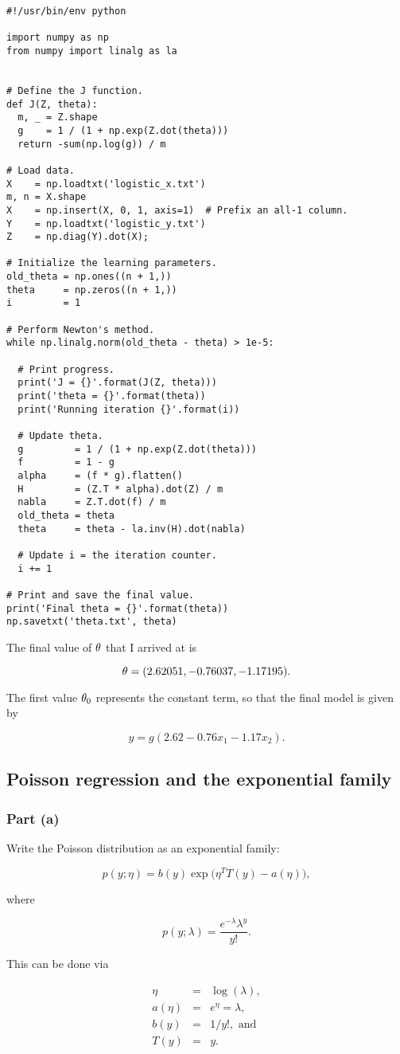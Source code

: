 \documentclass[]{article}
\begin{document}
\begin{verbatim}
#!/usr/bin/env python

import numpy as np
from numpy import linalg as la


# Define the J function.
def J(Z, theta):
  m, _ = Z.shape
  g    = 1 / (1 + np.exp(Z.dot(theta)))
  return -sum(np.log(g)) / m

# Load data.
X    = np.loadtxt('logistic_x.txt')
m, n = X.shape
X    = np.insert(X, 0, 1, axis=1)  # Prefix an all-1 column.
Y    = np.loadtxt('logistic_y.txt')
Z    = np.diag(Y).dot(X);

# Initialize the learning parameters.
old_theta = np.ones((n + 1,))
theta     = np.zeros((n + 1,))
i         = 1

# Perform Newton's method.
while np.linalg.norm(old_theta - theta) > 1e-5:

  # Print progress.
  print('J = {}'.format(J(Z, theta)))
  print('theta = {}'.format(theta))
  print('Running iteration {}'.format(i))

  # Update theta.
  g         = 1 / (1 + np.exp(Z.dot(theta)))
  f         = 1 - g
  alpha     = (f * g).flatten()
  H         = (Z.T * alpha).dot(Z) / m
  nabla     = Z.T.dot(f) / m
  old_theta = theta
  theta     = theta - la.inv(H).dot(nabla)

  # Update i = the iteration counter.
  i += 1

# Print and save the final value.
print('Final theta = {}'.format(theta))
np.savetxt('theta.txt', theta)
\end{verbatim}

The final value of \(\theta\) that I arrived at is

\[\theta = (2.62051, -0.76037, -1.17195).\]

The first value \(\theta_0\) represents the constant term, so that the
final model is given by

\[y = g(2.62 - 0.76x_1 - 1.17x_2).\]

\subsection{Poisson regression and the exponential
family}\label{poisson-regression-and-the-exponential-family}

\subsubsection{Part (a)}\label{part-a-1}

Write the Poisson distribution as an exponential family:

\[p(y;\eta) = b(y)\exp\big(\eta^T T(y) - a(\eta)\big),\]

where

\[p(y;\lambda) = \frac{e^{-\lambda}\lambda^y}{y!}.\]

This can be done via

\[\begin{array}{rcl}
\eta & = & \log(\lambda), \\
a(\eta) & = & e^\eta = \lambda, \\
b(y) & = & 1/y!, \text{ and} \\
T(y) & = & y.
\end{array}\]
\end{document}
